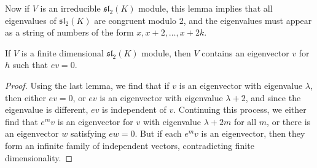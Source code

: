 Now if $V$ is an irreducible $\mathfrak{sl}_2(K)$ module, this lemma implies that all eigenvalues of $\mathfrak{sl}_2(K)$ are congruent modulo 2, and the eigenvalues must appear as a string of numbers of the form $x, x + 2, \dots, x + 2k$.

\begin{lemma}
    If $V$ is a finite dimensional $\mathfrak{sl}_2(K)$ module, then $V$ contains an eigenvector $v$ for $h$ such that $ev = 0$.
\end{lemma}
\begin{proof}
    Using the last lemma, we find that if $v$ is an eigenvector with eigenvalue $\lambda$, then either $ev = 0$, or $ev$ is an eigenvector with eigenvalue $\lambda + 2$, and since the eigenvalue is different, $ev$ is independent of $v$. Continuing this process, we either find that $e^m v$ is an eigenvector for $v$ with eigenvalue $\lambda + 2m$ for all $m$, or there is an eigenvector $w$ satisfying $ew = 0$. But if each $e^m v$ is an eigenvector, then they form an infinite family of independent vectors, contradicting finite dimensionality.
\end{proof}

